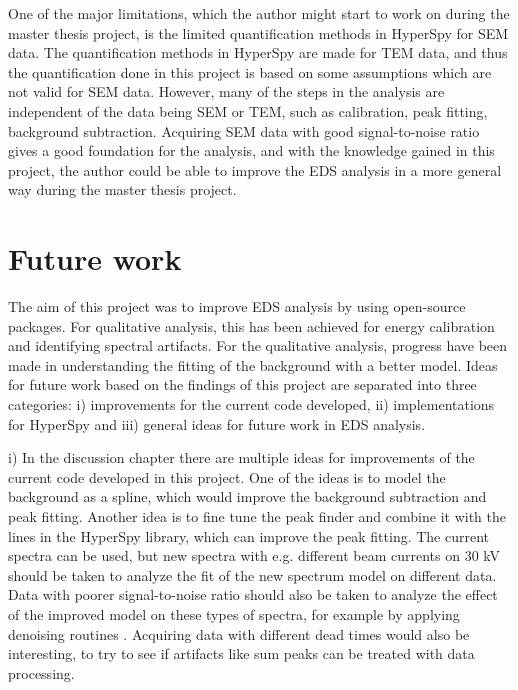 One of the major limitations, which the author might start to work on during the master thesis project, is the limited quantification methods in HyperSpy for SEM data.
The quantification methods in HyperSpy are made for TEM data, and thus the quantification done in this project is based on some assumptions which are not valid for SEM data.
However, many of the steps in the analysis are independent of the data being SEM or TEM, such as calibration, peak fitting, background subtraction.
Acquiring SEM data with good signal-to-noise ratio gives a good foundation for the analysis, and with the knowledge gained in this project, the author could be able to improve the EDS analysis in a more general way during the master thesis project.













\section{Future work}
\label{sec:futurework}


The aim of this project was to improve EDS analysis by using open-source packages.
For qualitative analysis, this has been achieved for energy calibration and identifying spectral artifacts.
For the qualitative analysis, progress have been made in understanding the fitting of the background with a better model.
Ideas for future work based on the findings of this project are separated into three categories: i) improvements for the current code developed, ii) implementations for HyperSpy and iii) general ideas for future work in EDS analysis.




i) In the discussion chapter there are multiple ideas for improvements of the current code developed in this project.
One of the ideas is to model the background as a spline, which would improve the background subtraction and peak fitting.
Another idea is to fine tune the peak finder and combine it with the lines in the HyperSpy library, which can improve the peak fitting.
The current spectra can be used, but new spectra with e.g. different beam currents on 30 kV should be taken to analyze the fit of the new spectrum model on different data.
Data with poorer signal-to-noise ratio should also be taken to analyze the effect of the improved model on these types of spectra, for example by applying denoising routines \cite{moreira_2022}.
Acquiring data with different dead times would also be interesting, to try to see if artifacts like sum peaks can be treated with data processing.



